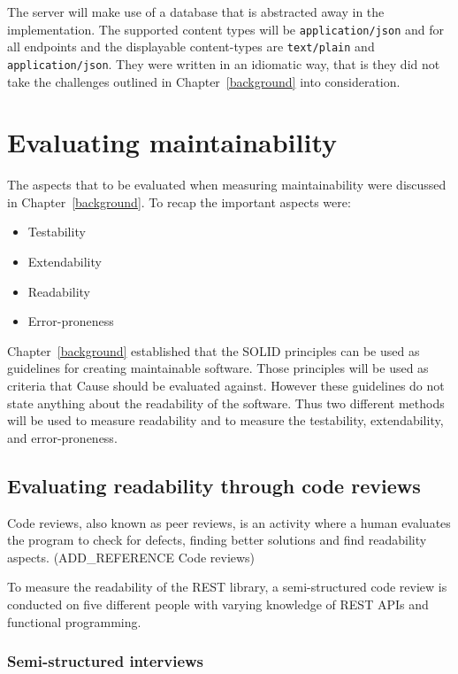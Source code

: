 The server will make use of a database that is abstracted away in the
implementation. The supported content types will be \texttt{application/json}
and for all endpoints and the displayable content-types are \texttt{text/plain}
and \texttt{application/json}.  They were written in an idiomatic way, that is
they did not take the challenges outlined in Chapter~\ref{background} into
consideration.

\section{Evaluating maintainability}\label{evaluatingmaintainability}

The aspects that to be evaluated when measuring maintainability were discussed
in Chapter~\ref{background}. To recap the important aspects were:

\begin{itemize}
    \item Testability
    \item Extendability
    \item Readability
    \item Error-proneness
\end{itemize}

Chapter~\ref{background} established that the SOLID principles can be used as
guidelines for creating maintainable software. Those principles will be used as
criteria that Cause should be evaluated against.  However these guidelines do
not state anything about the readability of the software.  Thus two different
methods will be used to measure readability and to measure the testability,
extendability, and error-proneness.

\subsection{Evaluating readability through code reviews}

Code reviews, also known as peer reviews, is an activity where a human evaluates
the program to check for defects, finding better solutions and find readability
aspects. (ADD\_REFERENCE Code reviews)

To measure the readability of the REST library, a semi-structured code review is
conducted on five different people with varying knowledge of REST APIs and
functional programming.

\subsubsection{Semi-structured interviews}

